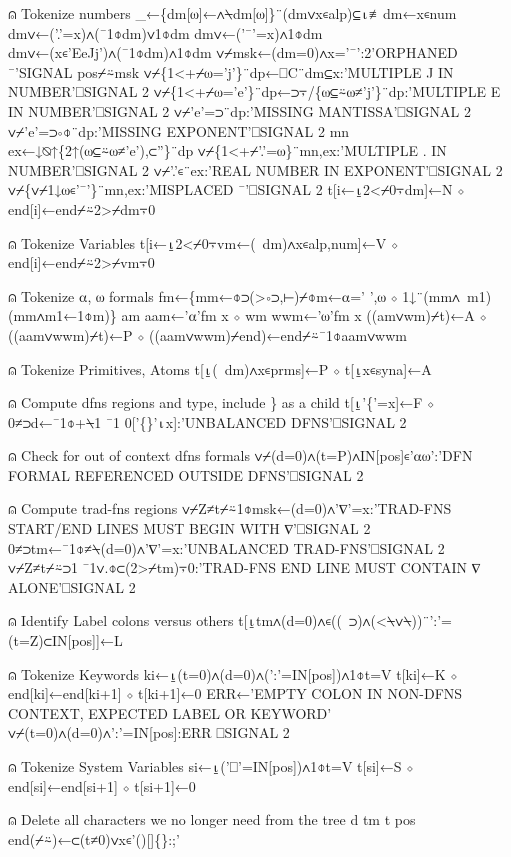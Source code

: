 \documentclass{article}%
\begin{document}
⍝ Tokenize numbers
         _←\{dm[⍵]←∧⍀dm[⍵]\}¨(dm∨x∊alp)⊆⍳≢dm←x∊num
         dm∨←('.'=x)∧(¯1⌽dm)∨1⌽dm
         dm∨←('¯'=x)∧1⌽dm
         dm∨←(x∊'EeJj')∧(¯1⌽dm)∧1⌽dm
         ∨⌿msk←(dm=0)∧x='¯':2'ORPHANED ¯'SIGNAL pos⌿⍨msk
         ∨⌿\{1<+⌿⍵='j'\}¨dp←⎕C¨dm⊆x:'MULTIPLE J IN NUMBER'⎕SIGNAL 2
         ∨⌿\{1<+⌿⍵='e'\}¨dp←⊃⍪/\{⍵⊆⍨⍵≠'j'\}¨dp:'MULTIPLE E IN NUMBER'⎕SIGNAL 2
         ∨⌿'e'=⊃¨dp:'MISSING MANTISSA'⎕SIGNAL 2
         ∨⌿'e'=⊃∘⌽¨dp:'MISSING EXPONENT'⎕SIGNAL 2
         mn ex←↓⍉↑\{2↑(⍵⊆⍨⍵≠'e'),⊂''\}¨dp
         ∨⌿\{1<+⌿'.'=⍵\}¨mn,ex:'MULTIPLE . IN NUMBER'⎕SIGNAL 2
         ∨⌿'.'∊¨ex:'REAL NUMBER IN EXPONENT'⎕SIGNAL 2
         ∨⌿\{∨⌿1↓⍵∊'¯'\}¨mn,ex:'MISPLACED ¯'⎕SIGNAL 2
         t[i←⍸2<⌿0⍪dm]←N ⋄ end[i]←end⌿⍨2>⌿dm⍪0

⍝ Tokenize Variables
         t[i←⍸2<⌿0⍪vm←(~dm)∧x∊alp,num]←V ⋄ end[i]←end⌿⍨2>⌿vm⍪0

⍝ Tokenize ⍺, ⍵ formals
         fm←\{mm←⌽⊃(>∘⊃,⊢)⌿⌽m←⍺=' ',⍵ ⋄ 1↓¨(mm∧~m1)(mm∧m1←1⌽m)\}
         am aam←'⍺'fm x ⋄ wm wwm←'⍵'fm x
         ((am∨wm)⌿t)←A ⋄ ((aam∨wwm)⌿t)←P ⋄ ((aam∨wwm)⌿end)←end⌿⍨¯1⌽aam∨wwm

⍝ Tokenize Primitives, Atoms
         t[⍸(~dm)∧x∊prms]←P ⋄ t[⍸x∊syna]←A

⍝ Compute dfns regions and type, include \} as a child
         t[⍸'\{'=x]←F ⋄ 0≠⊃d←¯1⌽+⍀1 ¯1 0['\{\}'⍳x]:'UNBALANCED DFNS'⎕SIGNAL 2

⍝ Check for out of context dfns formals
         ∨⌿(d=0)∧(t=P)∧IN[pos]∊'⍺⍵':'DFN FORMAL REFERENCED OUTSIDE DFNS'⎕SIGNAL 2

⍝ Compute trad-fns regions
         ∨⌿Z≠t⌿⍨1⌽msk←(d=0)∧'∇'=x:'TRAD-FNS START/END LINES MUST BEGIN WITH ∇'⎕SIGNAL 2
         0≠⊃tm←¯1⌽≠⍀(d=0)∧'∇'=x:'UNBALANCED TRAD-FNS'⎕SIGNAL 2
         ∨⌿Z≠t⌿⍨⊃1 ¯1∨.⌽⊂(2>⌿tm)⍪0:'TRAD-FNS END LINE MUST CONTAIN ∇ ALONE'⎕SIGNAL 2

⍝ Identify Label colons versus others
         t[⍸tm∧(d=0)∧∊((~⊃)∧(<⍀∨⍀))¨':'=(t=Z)⊂IN[pos]]←L

⍝ Tokenize Keywords
         ki←⍸(t=0)∧(d=0)∧(':'=IN[pos])∧1⌽t=V
         t[ki]←K ⋄ end[ki]←end[ki+1] ⋄ t[ki+1]←0
         ERR←'EMPTY COLON IN NON-DFNS CONTEXT, EXPECTED LABEL OR KEYWORD'
         ∨⌿(t=0)∧(d=0)∧':'=IN[pos]:ERR ⎕SIGNAL 2

⍝ Tokenize System Variables
         si←⍸('⎕'=IN[pos])∧1⌽t=V
         t[si]←S ⋄ end[si]←end[si+1] ⋄ t[si+1]←0

⍝ Delete all characters we no longer need from the tree
         d tm t pos end(⌿⍨)←⊂(t≠0)∨x∊'()[]\{\}:;'
\end{document}
